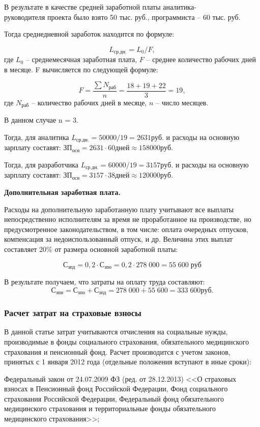 В результате в качестве средней заработной платы аналитика-\\руководителя проекта было взято 50 тыс. руб., программиста – 60 тыс. руб.

Тогда среднедневной заработок находится по формуле:

$$L_{ср.дн.}=L_{0}/F,$$ 
где $L_{0}$ – среднемесячная заработная плата, $F$ – среднее количество рабочих дней в месяце. F вычисляется по следующей формуле:

$$ F = \frac{\sum N_{раб}}{n} = \frac{18+19+22}{3} = 19,$$
где $N_{раб}$ – количество рабочих дней в месяце, $n$ – число месяцев.

В данном случае n = 3.

Тогда, для аналитика $L_{ср.дн.}= 50 000 / 19 = 2 631 руб.$ и расходы на основную зарплату составят: $ЗП_{осн} = 2 631 \cdot 60 дней \approx 158 000 руб.$

Тогда, для разработчика  $ L_{ср.дн.}= 60 000 / 19 = 3 157 руб.$ и расходы на основную зарплату составят: $ЗП_{осн} = 3 157 \cdot 38 дней \approx 120 000 руб.$

\textbf{Дополнительная  заработная плата.}

Расходы на дополнительную заработанную плату учитывают все выплаты непосредственно исполнителям за время не проработанное на производстве, но предусмотренное законодательством, в том числе: оплата очередных отпусков, компенсация за недоиспользованный отпуск, и др. Величина этих выплат составляет 20\% от размера основной заработной платы:

$$С_{зпд} = 0,2 \cdot С_{зпо} = 0,2 \cdot 278\;000 = 55\;600 \; руб$$

В результате получаем, что  затраты на  оплату труда составляют:
$$С_{зпи} = С_{зпо} + С_{зпд} = 278\;000 + 55\;600 = 333\;600 руб.$$

\subsubsection{Расчет затрат на  страховые взносы}

В данной статье затрат учитываются отчисления на социальные нужды, производимые в фонды социального страхования, обязательного медицинского страхования и пенсионный фонд. Расчет производится с учетом законов, принятых с 1 января 2012 года (отдельные положения вступают в иные сроки):

Федеральный закон от 24.07.2009   ФЗ (ред. от 28.12.2013) <<О страховых взносах в Пенсионный фонд Российской Федерации, Фонд социального страхования Российской Федерации, Федеральный фонд обязательного медицинского страхования и территориальные фонды обязательного медицинского страхования>>;

